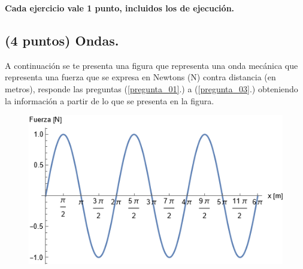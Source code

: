 \documentclass[12pt]{exam}
\begin{document}

\setcounter{page}{3}

\newpage
\begin{center}
\textbf{Cada ejercicio vale 1 punto, incluidos los de ejecución.}
\end{center}

\begin{questions}

    \section{(4 puntos) Ondas.}
    
    \vbox{\leftskip\leftmargin A continuación se te presenta una figura que representa una onda mecánica que representa una fuerza que se expresa en Newtons (\unit{\newton}) contra distancia (en metros), responde las preguntas (\ref{pregunta_01}.) a (\ref{pregunta_03}.) obteniendo la información a partir de lo que se presenta en la figura.}

    \begin{figure}[H]
        \centering
        \includegraphics[scale=0.8]{Imagenes/Ejercicio_Ondas_01.png}
    \end{figure}


\end{questions}
\end{document}
